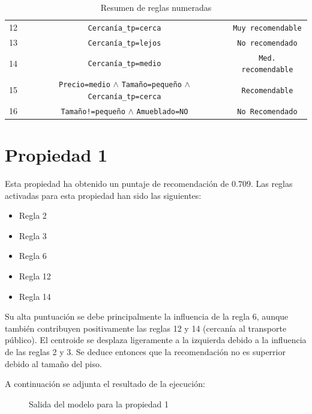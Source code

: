 \documentclass[12pt]{report} %
\begin{document}
\begin{table}[H]
\begin{tabular}{@{}ccc@{}}
        12 & \texttt{Cercanía\_tp=cerca}                                   & \texttt{Muy recomendable}\\
        13 & \texttt{Cercanía\_tp=lejos}                                   & \texttt{No recomendado}\\
        14 & \texttt{Cercanía\_tp=medio}                                   & \texttt{Med. recomendable}\\
        15 & \texttt{Precio=medio} $\land$ \texttt{Tamaño=pequeño} $\land$ \texttt{Cercanía\_tp=cerca}      & \texttt{Recomendable}\\
        16 & \texttt{Tamaño!=pequeño} $\land$ \texttt{Amueblado=NO}           & \texttt{No Recomendado}\\

        \bottomrule
    \end{tabular}
    \caption{Resumen de reglas numeradas}
    \end{table}

    \section{Propiedad 1}
    
    Esta propiedad ha obtenido un puntaje de recomendación de $0.709$. Las reglas activadas para esta propiedad han sido las siguientes: 
    \begin{itemize}
        \item Regla 2
        \item Regla 3
        \item Regla 6
        \item Regla 12
        \item Regla 14
    \end{itemize}
    Su alta puntuación se debe principalmente la influencia de la regla 6,
    aunque también contribuyen positivamente las reglas 12 y 14 (cercanía al
    transporte público). El centroide se desplaza ligeramente a la izquierda
    debido a la influencia de las reglas 2 y 3. Se deduce entonces que la
    recomendación no es superrior debido al tamaño del piso.

    A continuación se adjunta el resultado de la ejecución:
    \begin{figure}[H]
        \centering
        \caption{Salida del modelo para la propiedad 1}
    \end{figure}
\end{document}
